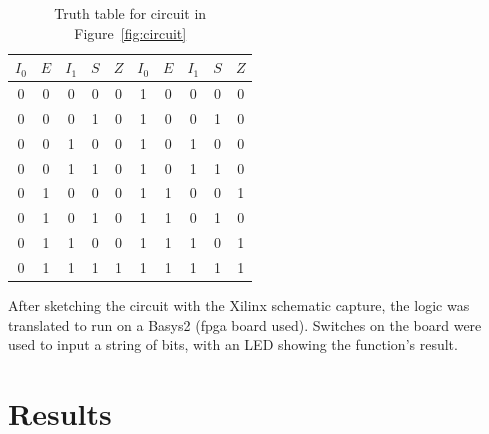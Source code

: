 \documentclass{article}
\begin{document}
\begin{table}[hbtp]
  \label{tab:truth}
  \centering
  \begin{tabular}{cccc|c || cccc|c}
    $I_0$ & $E$ & $I_1$ & $S$ & $Z$ & $I_0$ & $E$ & $I_1$ & $S$ & $Z$ \\
    \hline
    0 & 0 & 0 & 0 & 0 & 1 & 0 & 0 & 0 & 0 \\
    0 & 0 & 0 & 1 & 0 & 1 & 0 & 0 & 1 & 0 \\
    0 & 0 & 1 & 0 & 0 & 1 & 0 & 1 & 0 & 0 \\
    0 & 0 & 1 & 1 & 0 & 1 & 0 & 1 & 1 & 0 \\
    0 & 1 & 0 & 0 & 0 & 1 & 1 & 0 & 0 & 1 \\
    0 & 1 & 0 & 1 & 0 & 1 & 1 & 0 & 1 & 0 \\
    0 & 1 & 1 & 0 & 0 & 1 & 1 & 1 & 0 & 1 \\
    0 & 1 & 1 & 1 & 1 & 1 & 1 & 1 & 1 & 1 \\
  \end{tabular}
  \caption{Truth table for circuit in Figure~\ref{fig:circuit}}
\end{table}

After sketching the circuit with the Xilinx schematic capture, the logic was translated to run on a Basys2 (\gls{fpga} board used).  Switches on the board were used to input a string of bits, with an LED showing the function's result.

\section{Results}
\label{sec:results}
\end{document}
